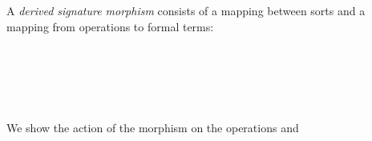 A \emph{derived signature morphism} consists of a mapping between sorts
and a mapping from operations to formal terms:
\begin{code}
\>[0]\AgdaSpace{}%
\AgdaSpace{}%
\AgdaSymbol{(}\AgdaSpace{}%
\AgdaSpace{}%
\AgdaSymbol{:}\AgdaSpace{}%
\AgdaSymbol{)}\AgdaSpace{}%
\AgdaSymbol{:}\AgdaSpace{}%
\AgdaSpace{}%
\<%
\\
\>[0][@{}l@{\AgdaIndent{0}}]%
\>[1]\AgdaSpace{}%
\AgdaSpace{}%
\<%
\\
%
\>[1]\<%
\\
\>[1][@{}l@{\AgdaIndent{0}}]%
\>[2]\AgdaSpace{}%
\AgdaSymbol{:}\AgdaSpace{}%
\AgdaSpace{}%
\AgdaSpace{}%
\AgdaSpace{}%
\AgdaSpace{}%
\<%
\\
%
\>[2]\AgdaSpace{}%
\AgdaSymbol{:}\AgdaSpace{}%
\AgdaSpace{}%
\AgdaSymbol{\{}\AgdaSpace{}%
\AgdaSymbol{\}}%
\>[17]\AgdaSpace{}%
\AgdaSpace{}%
\AgdaSpace{}%
\AgdaSymbol{(}\AgdaSpace{}%
\AgdaOperator{\AgdaInductiveConstructor{,}}\AgdaSpace{}%
\AgdaSymbol{)}\AgdaSpace{}%
\AgdaSpace{}%
\AgdaSpace{}%
\AgdaSpace{}%
\AgdaSpace{}%
\AgdaSpace{}%
\AgdaSpace{}%
\<%
\end{code}
\noindent We show the action of the morphism on the operations
 and 
